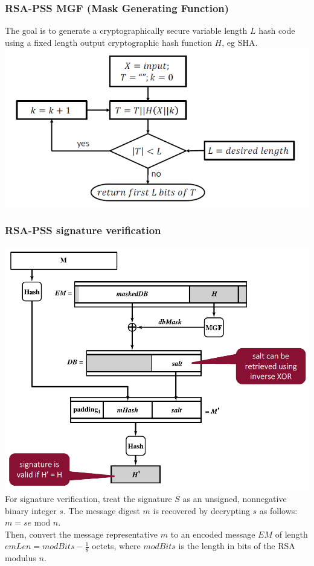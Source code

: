 \documentclass[12pt]{article}
\begin{document}
 \subsubsection{RSA-PSS MGF (Mask Generating Function)}
 The goal is to generate a cryptographically secure variable length $L$ hash code using a fixed length output cryptographic hash function $H$, eg SHA.\\
 \includegraphics[width=0.8\linewidth]{./slides/L4P5RSAPSSMGF.PNG}
 
 \subsubsection{RSA-PSS signature verification}
  \includegraphics[width=0.8\linewidth]{./slides/L4P5RSAPSSSIGVER.PNG}\\
  For signature verification, treat the signature $S$ as an unsigned, nonnegative binary integer $s$. The message digest $m$ is recovered by decrypting $s$ as follows: $m = se \text{ mod } n$.\\
  Then, convert the message representative $m$ to an encoded message $EM$ of length $emLen = modBits -\frac{1}{8}$ octets, where $modBits$ is the length in bits of the RSA modulus $n$.
\end{document}
